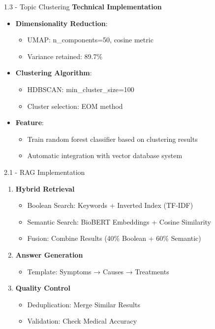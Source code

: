 \documentclass{beamer}
\begin{document}
	\begin{frame}{1.3 - Topic Clustering}
		\footnotesize
		\textbf{Technical Implementation}
		\begin{itemize}
			\item \textbf{Dimensionality Reduction}:
			\begin{itemize}
				\item UMAP: n\_components=50, cosine metric
				\item Variance retained: 89.7\%
			\end{itemize}
			
			\item \textbf{Clustering Algorithm}:
			\begin{itemize}
				\item HDBSCAN: min\_cluster\_size=100
				\item Cluster selection: EOM method
			\end{itemize}
			
			\item \textbf{Feature}:
			\begin{itemize}
				\item Train random forest classifier based on clustering results
				\item Automatic integration with vector database system
			\end{itemize}
		\end{itemize}
	\end{frame}
	
		\begin{frame}{2.1 - RAG Implementation}
		\footnotesize
		\begin{enumerate}
			\item \textbf{Hybrid Retrieval}
			\begin{itemize}
				\item Boolean Search: Keywords + Inverted Index (TF-IDF)
				\item Semantic Search: BioBERT Embeddings + Cosine Similarity
				\item Fusion: Combine Results (40\% Boolean + 60\% Semantic)
			\end{itemize}
			
			\item \textbf{Answer Generation}
			\begin{itemize}
				\item Template: Symptoms → Causes → Treatments
				\
			\end{itemize}
			
			\item \textbf{Quality Control}
			\begin{itemize}
				\item Deduplication: Merge Similar Results
				\item Validation: Check Medical Accuracy
			\end{itemize}
		\end{enumerate}
	\end{frame}
	
\end{document}
